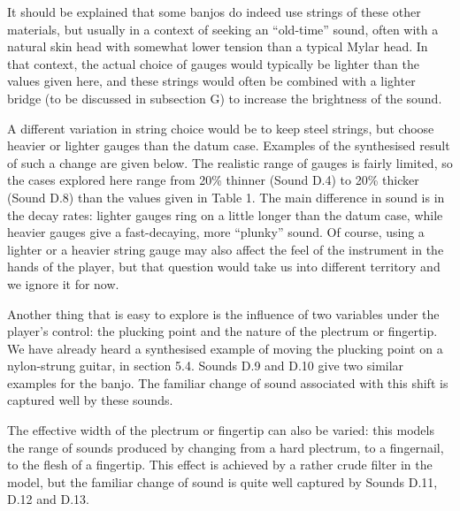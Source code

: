 \audio{}

\audio{}

\audio{}

\audio{}

  It should be explained that some banjos do indeed use strings of these other 
  materials, but usually in a context of seeking an ``old-time'' sound, often 
  with a natural skin head with somewhat lower tension than a typical Mylar 
  head. In that context, the actual choice of gauges would typically be lighter 
  than the values given here, and these strings would often be combined with a 
  lighter bridge (to be discussed in subsection G) to increase the brightness 
  of the sound. 

  A different variation in string choice would be to keep steel strings, but 
  choose heavier or lighter gauges than the datum case. Examples of the 
  synthesised result of such a change are given below. The realistic range of 
  gauges is fairly limited, so the cases explored here range from 20\% thinner 
  (Sound D.4) to 20\% thicker (Sound D.8) than the values given in Table 1. The 
  main difference in sound is in the decay rates: lighter gauges ring on a 
  little longer than the datum case, while heavier gauges give a fast-decaying, 
  more ``plunky'' sound. Of course, using a lighter or a heavier string gauge 
  may also affect the feel of the instrument in the hands of the player, but 
  that question would take us into different territory and we ignore it for 
  now. 

\audio{}

\audio{}

\audio{}

\audio{}

\audio{}

  Another thing that is easy to explore is the influence of two variables under 
  the player's control: the plucking point and the nature of the plectrum or 
  fingertip. We have already heard a synthesised example of moving the plucking 
  point on a nylon-strung guitar, in section 5.4. Sounds D.9 and D.10 give two 
  similar examples for the banjo. The familiar change of sound associated with 
  this shift is captured well by these sounds. 

\audio{}

\audio{}

  The effective width of the plectrum or fingertip can also be varied: this 
  models the range of sounds produced by changing from a hard plectrum, to a 
  fingernail, to the flesh of a fingertip. This effect is achieved by a rather 
  crude filter in the model, but the familiar change of sound is quite well 
  captured by Sounds D.11, D.12 and D.13. 

